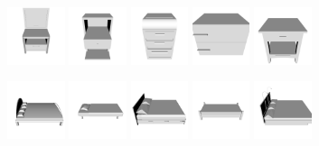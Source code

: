 \begin{figure}[!hbt]
	\includegraphics[width=0.15\textwidth]{Figures/ObjRecog/nstand_0}\hfill
	\includegraphics[width=0.15\textwidth]{Figures/ObjRecog/nstand_1}\hfill
	\includegraphics[width=0.15\textwidth]{Figures/ObjRecog/nstand_2}\hfill
	\includegraphics[width=0.15\textwidth]{Figures/ObjRecog/nstand_3}\hfill
	\includegraphics[width=0.15\textwidth]{Figures/ObjRecog/nstand_4}\hfill

	\includegraphics[width=0.15\textwidth]{Figures/ObjRecog/bed_0}\hfill
	\includegraphics[width=0.15\textwidth]{Figures/ObjRecog/bed_1}\hfill
	\includegraphics[width=0.15\textwidth]{Figures/ObjRecog/bed_2}\hfill
	\includegraphics[width=0.15\textwidth]{Figures/ObjRecog/bed_3}\hfill
	\includegraphics[width=0.15\textwidth]{Figures/ObjRecog/bed_4}\hfill


\end{figure}
